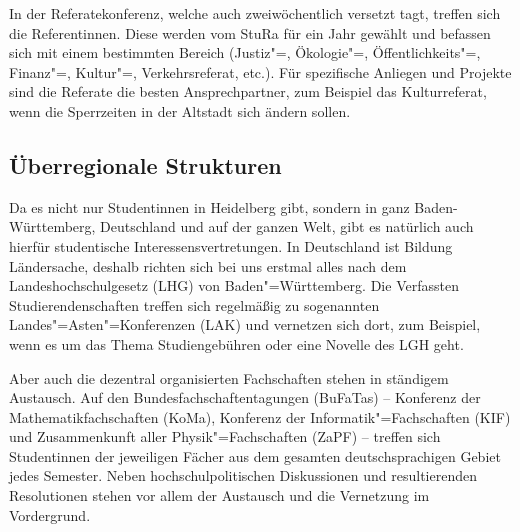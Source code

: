 In der Referatekonferenz, welche auch zweiwöchentlich versetzt tagt, treffen sich die Referentinnen. 
Diese werden vom StuRa für ein Jahr gewählt und befassen sich mit einem bestimmten Bereich (Justiz"=, Ökologie"=, Öffentlichkeits"=, Finanz"=, Kultur"=, Verkehrsreferat, etc.). 
Für spezifische Anliegen und Projekte sind die Referate die besten Ansprechpartner, zum Beispiel das Kulturreferat, wenn die Sperrzeiten in der Altstadt sich ändern sollen.

\subsection{Überregionale Strukturen}
Da es nicht nur Studentinnen in Heidelberg gibt, sondern in ganz Baden-Württemberg, Deutschland und auf der ganzen Welt, gibt es natürlich auch hierfür studentische Interessensvertretungen. 
In Deutschland ist Bildung Ländersache, deshalb richten sich bei uns erstmal alles nach dem Landeshochschulgesetz (LHG) von Baden"=Württemberg. 
Die Verfassten Studierendenschaften treffen sich regelmäßig zu sogenannten Landes"=Asten"=Konferenzen (LAK) und vernetzen sich dort, zum Beispiel, wenn es um das Thema Studiengebühren oder eine Novelle des LGH geht.

Aber auch die dezentral organisierten Fachschaften stehen in ständigem Austausch. 
Auf den Bundesfachschaftentagungen (BuFaTas) -- Konferenz der Mathematikfachschaften (KoMa), Konferenz der Informatik"=Fachschaften (KIF) und Zusammenkunft aller Physik"=Fachschaften (ZaPF) -- treffen sich Studentinnen der jeweiligen Fächer aus dem gesamten deutschsprachigen Gebiet jedes Semester. 
Neben hochschulpolitischen Diskussionen und resultierenden Resolutionen stehen vor allem der Austausch und die Vernetzung im Vordergrund.
